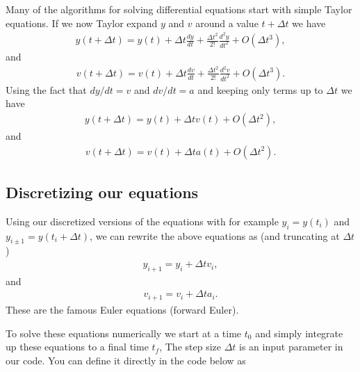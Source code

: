 \documentclass[letterpaper,10pt,english]{sphinxmanual}
\begin{document}
Many of the algorithms for solving differential equations start with simple Taylor equations.
If we now Taylor expand \(y\) and \(v\) around a value \(t+\Delta t\) we have
\begin{equation*}
\begin{split}
y(t+\Delta t) = y(t)+\Delta t \frac{dy}{dt}+\frac{\Delta t^2}{2!} \frac{d^2y}{dt^2}+O(\Delta t^3),
\end{split}
\end{equation*}
and
\begin{equation*}
\begin{split}
v(t+\Delta t) = v(t)+\Delta t \frac{dv}{dt}+\frac{\Delta t^2}{2!} \frac{d^2v}{dt^2}+O(\Delta t^3).
\end{split}
\end{equation*}
Using the fact that \(dy/dt = v\) and \(dv/dt=a\) and keeping only terms up to \(\Delta t\) we have
\begin{equation*}
\begin{split}
y(t+\Delta t) = y(t)+\Delta t v(t)+O(\Delta t^2),
\end{split}
\end{equation*}
and
\begin{equation*}
\begin{split}
v(t+\Delta t) = v(t)+\Delta t a(t)+O(\Delta t^2).
\end{split}
\end{equation*}

\subsection{Discretizing our equations}
\label{\detokenize{chapter2:discretizing-our-equations}}
Using our discretized versions of the equations with for example
\(y_{i}=y(t_i)\) and \(y_{i\pm 1}=y(t_i+\Delta t)\), we can rewrite the
above equations as (and truncating at \(\Delta t\))
\begin{equation*}
\begin{split}
y_{i+1} = y_i+\Delta t v_i,
\end{split}
\end{equation*}
and
\begin{equation*}
\begin{split}
v_{i+1} = v_i+\Delta t a_i.
\end{split}
\end{equation*}
These are the famous Euler equations (forward Euler).

To solve these equations numerically we start at a time \(t_0\) and simply integrate up these equations to a final time \(t_f\),
The step size \(\Delta t\) is an input  parameter in our code.
You can define it directly in the code below as
\end{document}
